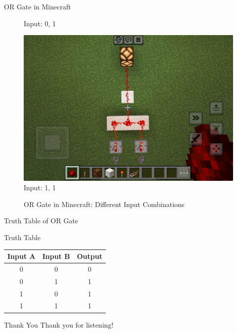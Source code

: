 \documentclass{beamer}
\begin{document}
\begin{frame}{OR Gate in Minecraft}
\begin{figure}[ht]
\begin{minipage}{0.32\textwidth}
            \small Input: 0, 1
        \end{minipage}
        \begin{minipage}{0.32\textwidth}
            \centering
            \includegraphics[width=\textwidth]{images/orgate_11.png}\\
            \small Input: 1, 1
        \end{minipage}
        \caption{OR Gate in Minecraft: Different Input Combinations}
    \end{figure}
\end{frame}

\begin{frame}{Truth Table of OR Gate}
    \begin{block}{Truth Table}
        \begin{tabular}{|c|c|c|}
            \hline
            Input A & Input B & Output \\
            \hline
            0 & 0 & 0 \\
            0 & 1 & 1 \\
            1 & 0 & 1 \\
            1 & 1 & 1 \\
            \hline
        \end{tabular}
    \end{block}
\end{frame}

\begin{frame}{Thank You}
    \centering
    Thank you for listening!
\end{frame}
\end{document}
